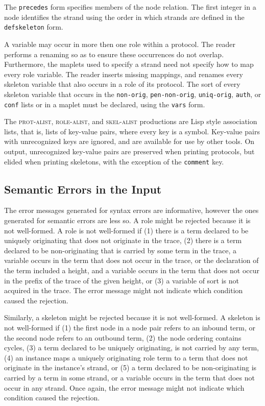 \documentclass[12pt]{article}
\begin{document}
The \texttt{precedes} form specifies members of the node relation.
The first integer in a node identifies the strand using the order in
which strands are defined in the \texttt{defskeleton} form.

A variable may occur in more then one role within a protocol.  The
reader performs a renaming so as to ensure these occurrences do not
overlap.  Furthermore, the maplets used to specify a strand need not
specify how to map every role variable.  The reader inserts missing
mappings, and renames every skeleton variable that also occurs in a
role of its protocol.  The sort of every skeleton variable that occurs
in the \texttt{non-orig}, \texttt{pen-non-orig}, \texttt{uniq-orig},
\texttt{auth}, or \texttt{conf} lists or in a maplet must be declared,
using the \texttt{vars} form.

The \textsc{prot-alist}, \textsc{role-alist}, and \textsc{skel-alist}
productions are Lisp style association lists, that is, lists of
key-value pairs, where every key is a symbol.  Key-value pairs with
unrecognized keys are ignored, and are available for use by other
tools.  On output, unrecognized key-value pairs are preserved when
printing protocols, but elided when printing skeletons, with the
exception of the \texttt{comment} key.

\subsection{Semantic Errors in the Input}\label{sec:semantic errors}

The error messages generated for syntax errors are informative,
however the ones generated for semantic errors are less so.  A role
might be rejected because it is not well-formed.  A role is not well-formed if (1) there is a term
declared to be uniquely originating that does not originate in the
trace, (2) there is a term declared to be non-originating that is
carried by some term in the trace, a variable occurs in the term that
does not occur in the trace, or the declaration of the term included a
height, and a variable occurs in the term that does not occur in the
prefix of the trace of the given height, or (3) a variable of sort
 is not acquired in the trace.  The error message might not
indicate which condition caused the rejection.

Similarly, a skeleton might be rejected because it is not
well-formed.  A skeleton is not
well-formed if (1) the first node in a node pair refers to an inbound
term, or the second node refers to an outbound term, (2) the node
ordering contains cycles, (3) a term declared to be uniquely
originating, is not carried by any term, (4) an instance maps a
uniquely originating role term to a term that does not originate in
the instance's strand, or (5) a term declared to be non-originating is
carried by a term in some strand, or a variable occurs in the term
that does not occur in any strand.  Once again, the error message might
not indicate which condition caused the rejection.
\end{document}

